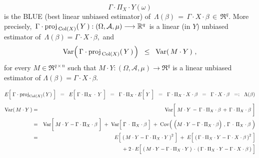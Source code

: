 \begin{theorem}
\begin{equation*}
\Gamma \cdot \Pi_{X} \cdot Y(\omega)
\end{equation*}
is the BLUE (best linear unbiased estimator) of
\,$\Lambda(\beta) \,=\, \Gamma \cdot X \cdot \beta \,\in\, \Re^{q}$.
More precisely,
\,$\Gamma \cdot \textnormal{proj}_{\,\textnormal{Col}(X)}\!\left(\,Y\,\right) : (\Omega,\mathcal{A},\mu) \longrightarrow \mathbb{R}^{q}$\,
is a linear (in $Y$) unbiased estimator of
\,$\Lambda(\beta) = \Gamma \cdot X \cdot \beta$,\, and
\begin{equation*}
\textnormal{Var}\!\left(\,\Gamma \cdot \textnormal{proj}_{\,\textnormal{Col}(X)}\!\left(\,Y\,\right)\,\right)
\;\; \leq \;\;
	\textnormal{Var}\!\left(\,M \cdot Y\,\right)\,,
\end{equation*}
for every $M \in \Re^{q \times n}$ such that
$M \cdot Y : (\Omega,\mathcal{A},\mu) \longrightarrow \Re^{q}$
is a linear unbiased estimator of
$\Lambda(\beta) = \Gamma \cdot X \cdot \beta$.
\end{theorem}
\proof
\begin{equation*}
E\!\left[\;\Gamma \cdot \proj_{\Col(X)}(\,Y)\;\right]
\;\; = \;\;
	E\!\left[\;\Gamma \cdot \Pi_{X} \overset{{\color{white}+}}{\cdot} Y\;\right]
\;\; = \;\;
	\Gamma \cdot \Pi_{X} \cdot E\!\left[\;\overset{{\color{white}.}}{Y}\;\right]
\;\; = \;\;
	\Gamma \cdot \Pi_{X} \cdot X \cdot \beta
\;\; = \;\;
	\Gamma \cdot X \cdot \beta
\;\; =: \;\;
	\Lambda(\beta)
\end{equation*}
\begin{eqnarray*}
\Var\!\left(\,M \cdot Y\,\right)
&=&
	\Var\!\left[\;
		M \cdot Y
		\,\overset{{\color{white}+}}{-}\,
		\Gamma \cdot \Pi_{X} \cdot \beta
		\,+\,
		\Gamma \cdot \Pi_{X} \cdot \beta
		\;\right]
\\
&=&
	\Var\!\left[\;
		M \cdot Y
		\overset{{\color{white}+}}{-}
		\Gamma \cdot \Pi_{X} \cdot \beta
		\;\right]
	\; + \;
	\Var\!\left[\;
		\Gamma \overset{{\color{white}+}}{\cdot} \Pi_{X} \cdot \beta
		\;\right]
	\; + \;
	\Cov\!\left(\;
		\left(M \cdot Y
		\overset{{\color{white}.}}{-}
		\Gamma \cdot \Pi_{X} \cdot \beta\right)
		\,,\,
		\Gamma \overset{{\color{white}+}}{\cdot} \Pi_{X} \cdot \beta
		\;\right)		
\\
&=&
	E\!\left[\;\left(\,
		M \cdot Y - \Gamma \cdot \Pi_{X} \cdot Y
		\,\right)^{2}\;\right]
	\;+\;
	E\!\left[\;\left(\,
		\Gamma \cdot \Pi_{X} \cdot Y - \Gamma \cdot X \cdot \beta
		\,\right)^{2}\;\right]
\\
&&
	\;+\;
	2 \cdot
	E\!\left[\;
		\left(\,M \cdot Y - \Gamma \cdot \Pi_{X} \cdot Y\,\right)
		\overset{{\color{white}+}}{\cdot}
		\left(\,\Gamma \cdot \Pi_{X} \cdot Y - \Gamma \cdot X \cdot \beta\,\right)
		\;\right]
\end{eqnarray*}
